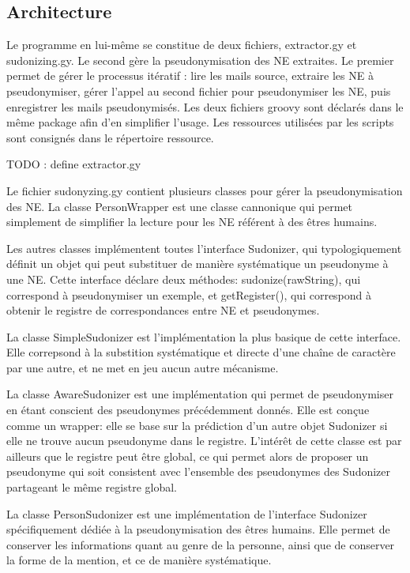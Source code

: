 \documentclass{article}
\begin{document}
\subsection{Architecture}
\par
Le programme en lui-même se constitue de deux fichiers, extractor.gy et sudonizing.gy.
Le second gère la pseudonymisation des NE extraites.
Le premier permet de gérer le processus itératif : lire les mails source, extraire les NE à pseudonymiser, gérer l'appel au second fichier pour pseudonymiser les NE, puis enregistrer les mails pseudonymisés.
Les deux fichiers groovy sont déclarés dans le même package afin d'en simplifier l'usage.
Les ressources utilisées par les scripts sont consignés dans le répertoire ressource.
\par
TODO : define extractor.gy
\par
Le fichier sudonyzing.gy contient plusieurs classes pour gérer la pseudonymisation des NE.
La classe PersonWrapper est une classe cannonique qui permet simplement de simplifier la lecture pour les NE référent à des êtres humains.
\par
Les autres classes implémentent toutes l'interface Sudonizer, qui typologiquement définit un objet qui peut substituer de manière systématique un pseudonyme à une NE.
Cette interface déclare deux méthodes: sudonize(rawString), qui correspond à pseudonymiser un exemple, et getRegister(), qui correspond à obtenir le registre de correspondances entre NE et pseudonymes.
\par
La classe SimpleSudonizer est l'implémentation la plus basique de cette interface.
Elle correpsond à la substition systématique et directe d'une chaîne de caractère par une autre, et ne met en jeu aucun autre mécanisme.
\par
La classe AwareSudonizer est une implémentation qui permet de pseudonymiser en étant conscient des pseudonymes précédemment donnés.
Elle est conçue comme un wrapper: elle se base sur la prédiction d'un autre objet Sudonizer si elle ne trouve aucun pseudonyme dans le registre.
L'intérêt de cette classe est par ailleurs que le registre peut être global, ce qui permet alors de proposer un pseudonyme qui soit consistent avec l'ensemble des pseudonymes des Sudonizer partageant le même registre global.
\par
La classe PersonSudonizer est une implémentation de l'interface Sudonizer spécifiquement dédiée à la pseudonymisation des êtres humains.
Elle permet de conserver les informations quant au genre de la personne, ainsi que de conserver la forme de la mention, et ce de manière systématique.
\end{document}
